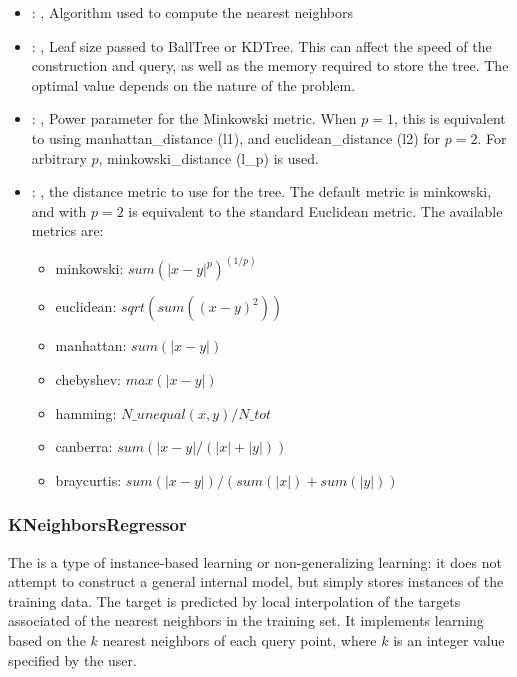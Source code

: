 \begin{itemize}
    \item {}: , 
      Algorithm used to compute the nearest neighbors

    \item {}: , 
      Leaf size passed to BallTree or KDTree. This can affect the speed of the construction
      and query, as well as the memory required to store the tree. The optimal value depends on the
      nature of the problem.

    \item {}: , 
      Power parameter for the Minkowski metric. When $p = 1$, this is equivalent to using
      manhattan\_distance (l1), and euclidean\_distance (l2) for $p = 2$. For arbitrary $p$,
      minkowski\_distance                                                  (l\_p) is used.

    \item {}: , 
      the distance metric to use for the tree. The default metric is minkowski, and with
      $p=2$ is equivalent to the standard Euclidean metric.
      The available metrics are:                                                  \begin{itemize}
      \item minkowski: $sum(|x - y|^p)^(1/p)$
      \item euclidean: $sqrt(sum((x - y)^2))$
      \item manhattan: $sum(|x - y|)$                                                    \item
      chebyshev: $max(|x - y|)$                                                    \item hamming:
      $N\_unequal(x, y) / N\_tot$                                                    \item canberra:
      $sum(|x - y| / (|x| + |y|))$                                                    \item
      braycurtis: $sum(|x - y|) / (sum(|x|) + sum(|y|))$
      \end{itemize}
  \end{itemize}


\subsubsection{KNeighborsRegressor}
  The  is a type of instance-based learning or
  non-generalizing learning: it does not attempt to construct a general internal
  model, but simply stores instances of the training data.                          The target is
  predicted by local interpolation of the targets associated                          of the nearest
  neighbors in the training set.                          It implements learning based on the $k$
  nearest neighbors of each query point,                          where $k$ is an integer value
  specified by the user.                          

